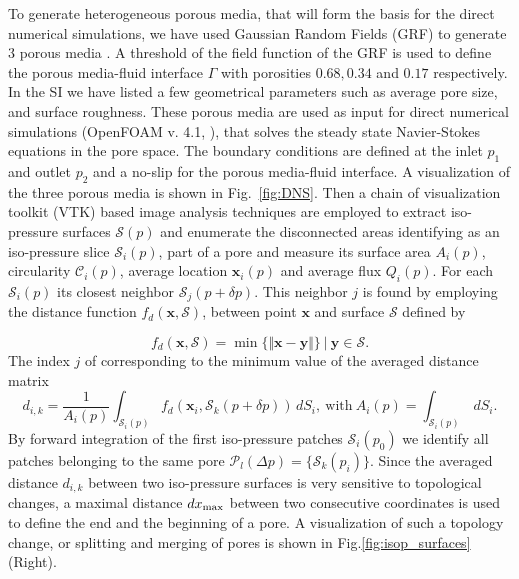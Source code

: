\documentclass[draft]{agujournal2019}
\begin{document}
To generate heterogeneous porous media, that will form the basis for the direct numerical simulations, we have used Gaussian Random Fields (GRF) to generate 3 porous media \cite{teubner_level_1991,hyman_heterogeneities_2012,siena_relationship_2014}. A threshold of the field function of the GRF is used to define the porous media-fluid interface $\Gamma$ with porosities $0.68, 0.34$ and $0.17$ respectively. In the SI we have listed a few geometrical parameters such as average pore size, and surface roughness. These porous media are used as input for direct numerical simulations (OpenFOAM v. 4.1, ), that solves the steady state Navier-Stokes equations in the pore space. The boundary conditions are defined at the inlet $p_1$ and outlet $p_2$ and a no-slip for the porous media-fluid interface. A visualization of the three porous media is shown in Fig.~\ref{fig:DNS}. Then a chain of visualization toolkit (VTK) based image analysis techniques \cite{schroeder_visualization_2006,hernderson_paraview_2007} are employed to extract iso-pressure surfaces $\mathcal{S}(p)$ and enumerate the disconnected areas identifying as an iso-pressure slice $\mathcal{S}_i(p)$, part of a pore and measure its surface area $A_i(p)$, circularity $\mathcal{C}_i(p)$, average location $\mathbf{x}_i(p)$ and average flux $Q_i(p)$. For each $\mathcal{S}_i(p)$ its closest neighbor $\mathcal{S}_j(p+\delta p)$. This neighbor $j$ is found by employing the distance function $f_d(\mathbf{x},\mathcal{S})$, between point $\mathbf{x}$ and surface $\mathcal{S}$ defined by 

\begin{equation}
	f_d\left(\mathbf{x},\mathcal{S}\right) = \min \{\Vert\mathbf{x}-\mathbf{y}\Vert \} ~|~ \mathbf{y}\in \mathcal{S}.
\end{equation}
The index $j$ of corresponding to the minimum value of the averaged distance matrix 
\begin{equation}
	d_{i,k} = \frac{1}{A_i(p)}\int_{\mathcal{S}_i(p)} f_d(\mathbf{x}_i,\mathcal{S}_k(p+\delta p)) \,dS_i, ~\textrm{with}~ A_i(p) = \int_{\mathcal{S}_i(p)}\,dS_i.
\end{equation}
By forward integration of the first iso-pressure patches $\mathcal{S}_i(p_0)$ we identify all patches belonging to the same pore $\mathcal{P}_l(\Delta p) = \{\mathcal{S}_k(p_i)\}$. Since the averaged distance $d_{i,k}$ between two iso-pressure surfaces is very sensitive to topological changes, a maximal distance $dx_{\rm{max}}$ between two consecutive coordinates is used to define the end and the beginning of a pore. A visualization of such a topology change, or splitting and merging of pores is shown in Fig.\ref{fig:isop_surfaces} (Right).
\end{document}
